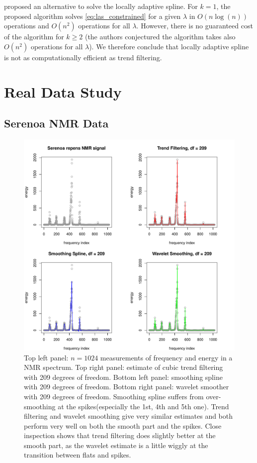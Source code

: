 \documentclass[a4paper]{article}
\begin{document}
\cite{mammen1997locally} proposed an alternative to solve the locally adaptive spline. For $k = 1$, the proposed algorithm solves \eqref{eq:las_constrained} for a given $\lambda$ in $O(n\log(n))$ operations and $O(n^2)$ operations for all $\lambda$. However, there is no guaranteed cost of the algorithm for $k\geq 2$ (the authors conjectured the algorithm takes also $O(n^2)$ operations for all $\lambda$). We therefore conclude that locally adaptive spline is not as computationally efficient as trend filtering. 

\section{Real Data Study}
\label{sec:real_data}

\subsection{Serenoa NMR Data}
\label{subsec:nmr}

\begin{figure}[t!]
\centering
\includegraphics[width = 1\textwidth]{Figures/Figure9.pdf}
\caption{Top left panel: $n=1024$ measurements of frequency and energy in a NMR spectrum. Top right panel: estimate of cubic trend filtering with 209 degrees of freedom. Bottom left panel: smoothing spline with 209 degrees of freedom. Bottom right panel: wavelet smoother with 209 degrees of freedom. Smoothing spline suffers from over-smoothing at the spikes(especially the 1st, 4th and 5th one). Trend filtering and wavelet smoothing give very similar estimates and both perform very well on both the smooth part and the spikes. Close inspection shows that trend filtering does slightly better at the smooth part, as the wavelet estimate is a little wiggly at the transition between flats and spikes.}
\label{fig:Figure_9}
\end{figure}
\end{document}

